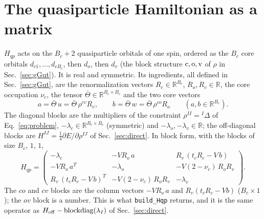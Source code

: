 \documentclass[11pt]{article}
\begin{document}
\appendix
\section{The quasiparticle Hamiltonian as a matrix}
\label{sec:appHqp}

$H_{qp}$ acts on the $B_c+2$ quasiparticle orbitals of one spin, ordered as the $B_c$ core orbitals $d_{c1},\dots,d_{cB_c}$, then $d_o$, then $d_v$
(the block structure ${\rm c},{\rm o},{\rm v}$ of $\rho$ in Sec.~\ref{sec:gGut}). It is real and symmetric. Its ingredients, all defined in Sec.~\ref{sec:gGut}, are the
renormalization vectors $R_c\in\mathbb R^{B_c}$, $R_o,R_v\in\mathbb R$, the core occupation $\nu_c$, the tensor $\bar\Theta\in\mathbb R^{B_c\times B_c}$
and the two core vectors
\begin{equation}
a=\bar\Theta\,u=\bar\Theta\,\rho^{cv}R_v,\qquad b=\bar\Theta\,w=\bar\Theta\,\rho^{co}R_o\qquad(a,b\in\mathbb R^{B_c}).
\end{equation}
The diagonal blocks are the multipliers of the constraint $\rho^{II}={}^I\Delta$ of Eq.~\eqref{eq:problem}, $-\lambda_c\in\mathbb R^{B_c\times B_c}$ (symmetric) and
$-\lambda_o,-\lambda_v\in\mathbb R$; the off-diagonal blocks are $H^{IJ}=\tfrac14\partial E/\partial\rho^{IJ}$ of Sec.~\ref{sec:direct}. In block form, with the blocks of
size $B_c$, $1$, $1$,
\begin{equation}
H_{qp}=
\begin{pmatrix}
-\lambda_c & -V R_o\,a & R_v\,(t_cR_c-V\,b)\\[2pt]
-V R_o\,a^T & -\lambda_o & -V(2-\nu_c)\,R_oR_v\\[2pt]
R_v\,(t_cR_c-V\,b)^T & -V(2-\nu_c)\,R_oR_v & -\lambda_v
\end{pmatrix}.
\label{eq:Hqpblock}
\end{equation}
The $co$ and $cv$ blocks are the column vectors $-VR_o\,a$ and $R_v(t_cR_c-Vb)$ ($B_c\times1$); the $ov$ block is a number.
This is what \texttt{build\_Hqp} returns, and it is the same operator as $H_{\rm off}-\mathrm{blockdiag}(\lambda_I)$ of Sec.~\ref{sec:direct}.
\end{document}
